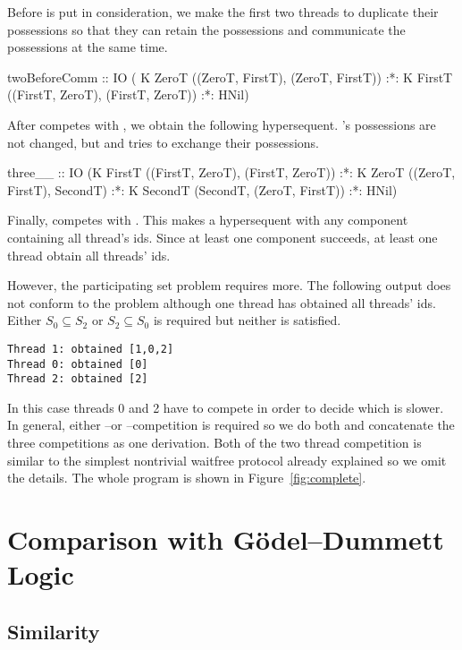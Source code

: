 Before \verb@SecondT@ is put in consideration, we make the first two threads
to duplicate their possessions so that they can retain the possessions
and communicate the possessions at the same time.
\begin{spec}
twoBeforeComm :: IO ( K ZeroT ((ZeroT, FirstT), (ZeroT, FirstT)) :*:
                      K FirstT ((FirstT, ZeroT), (FirstT, ZeroT)) :*:
                      HNil)
\end{spec}

After \verb@SecondT@ competes with \verb@ZeroT@, we obtain the following
hypersequent.  \verb@FirstT@'s possessions are not changed, but \verb@ZeroT@ and
\verb@SecondT@ tries to exchange their possessions.
\begin{spec}
three__ :: IO
  (K FirstT ((FirstT, ZeroT), (FirstT, ZeroT)) :*:
   K ZeroT ((ZeroT, FirstT), SecondT) :*:
   K SecondT (SecondT, (ZeroT, FirstT)) :*: HNil)
\end{spec}
Finally, \verb@SecondT@ competes with \verb@FirstT@.  This makes a hypersequent with
any component containing all thread's ids.  Since at least one component succeeds,
at least one thread obtain all threads' ids.

However, the participating set problem requires more.  The following
output does not conform to the problem although one thread has obtained
all threads' ids.  Either $S_0 \subseteq S_2$ or $S_2\subseteq S_0$ is
required but neither is satisfied.
\begin{verbatim}
Thread 1: obtained [1,0,2]
Thread 0: obtained [0]
Thread 2: obtained [2]
\end{verbatim}
In this case threads 0 and 2 have to compete in order to decide which
is slower.  In general, either \verb@ZeroT@--\verb@SecondT@ or
\verb@FirstT@--\verb@SecondT@ competition is required so we do both and
concatenate the three competitions as one derivation.
Both of the two thread competition is similar to the simplest nontrivial
waitfree protocol already explained so we omit the details.  The whole
program is shown in Figure~\ref{fig:complete}.


\section{Comparison with G\"odel--Dummett Logic}


\subsection{Similarity}

